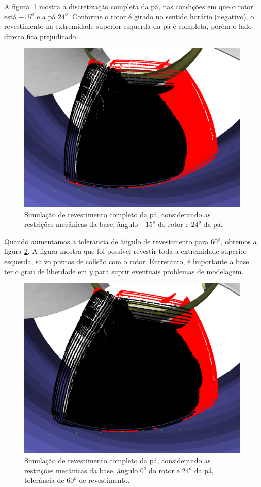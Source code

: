 A figura~\ref{fig::simcomp1_5} mostra a discretização completa da pá, nas
condições em que o rotor está $-15^o$ e a pá $24^o$. Conforme o rotor é
girado no sentido horário (negativo), o revestimento na extremidade superior
esquerda da pá é completa, porém o lado direito fica prejudicado.

\begin{figure}[!ht]
	\centering	
	\includegraphics[width=0.7\columnwidth]{method/figs/simcomp1_5.png}
	\caption{Simulação de revestimento completo da pá, considerando as
	restrições mecânicas da base, ângulo $-15^o$ do rotor e $24^o$ da pá.}
	\label{fig::simcomp1_5}
\end{figure}

Quando aumentamos a tolerância de ângulo de revestimento
para $60^o$, obtemos a figura \ref{fig::simcomp1_3}. A figura mostra que foi
possível revestir toda a extremidade superior esquerda, salvo pontos de colisão
com o rotor. Entretanto, é importante a base ter o grau de liberdade em $y$ para
suprir eventuais problemas de modelagem.

\begin{figure}[!ht]
	\centering	
	\includegraphics[width=0.7\columnwidth]{method/figs/simcomp1_3.png}
	\caption{Simulação de revestimento completo da pá, considerando as
	restrições mecânicas da base, ângulo $0^o$ do rotor e $24^o$ da pá,
	tolerância de $60^o$ de revestimento.}
	\label{fig::simcomp1_3}
\end{figure}

